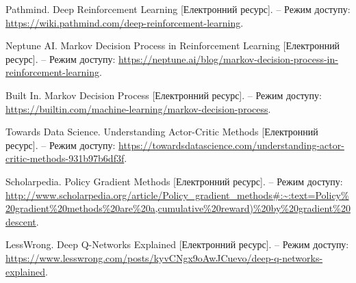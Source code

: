 \begin{thebibliography}{}
    Pathmind. Deep Reinforcement Learning [Електронний ресурс]. – Режим доступу: \url{https://wiki.pathmind.com/deep-reinforcement-learning}.

    Neptune AI. Markov Decision Process in Reinforcement Learning [Електронний ресурс]. – Режим доступу: \url{https://neptune.ai/blog/markov-decision-process-in-reinforcement-learning}.

    Built In. Markov Decision Process [Електронний ресурс]. – Режим доступу: \url{https://builtin.com/machine-learning/markov-decision-process}.
    
    Towards Data Science. Understanding Actor-Critic Methods [Електронний ресурс]. – Режим доступу: \url{https://towardsdatascience.com/understanding-actor-critic-methods-931b97b6df3f}.
    
    Scholarpedia. Policy Gradient Methods [Електронний ресурс]. – Режим доступу: \url{http://www.scholarpedia.org/article/Policy_gradient_methods#:~:text=Policy%20gradient%20methods%20are%20a,cumulative%20reward)%20by%20gradient%20descent}.
    
    LessWrong. Deep Q-Networks Explained [Електронний ресурс]. – Режим доступу: \url{https://www.lesswrong.com/posts/kyvCNgx9oAwJCuevo/deep-q-networks-explained}.
    
 \end {thebibliography}
